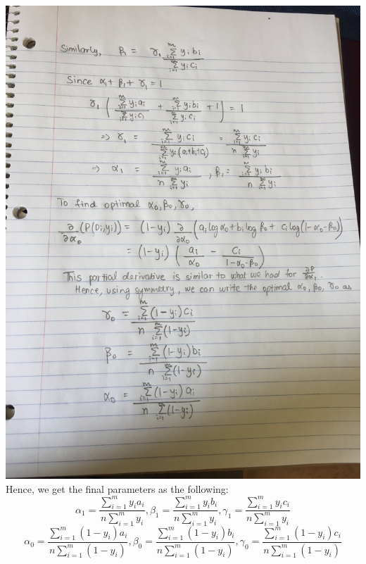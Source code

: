 \documentclass[11pt]{article}
\begin{document}
\begin{enumerate}
\includegraphics[scale=0.1]{1c_2.JPG} \newline
Hence, we get the final parameters as the following:
$$
\alpha_1 = \frac{\sum_{i=1}^m y_i a_i}{n \sum_{i=1}^m y_i },
\beta_1 = \frac{\sum_{i=1}^m y_i b_i}{n \sum_{i=1}^m y_i },
\gamma_1 = \frac{\sum_{i=1}^m y_i c_i}{n \sum_{i=1}^m y_i }
$$
$$
\alpha_0 = \frac{\sum_{i=1}^m (1 - y_i) a_i}{n \sum_{i=1}^m (1 - y_i) },
\beta_0 = \frac{\sum_{i=1}^m (1 - y_i) b_i}{n \sum_{i=1}^m (1 - y_i) },
\gamma_0 = \frac{\sum_{i=1}^m (1 - y_i) c_i}{n \sum_{i=1}^m (1 - y_i) }
$$

\end{enumerate}

\newpage
\end{document}
